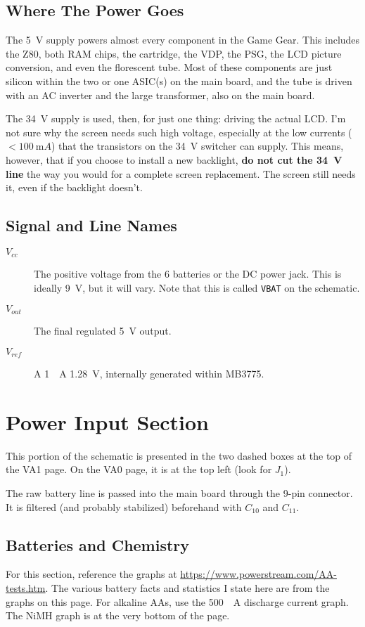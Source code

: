 \documentclass{article}
\newcommand{\Vcc}{$V_{cc}$}
\newcommand{\Vout}{$V_{out}$}
\newcommand{\Vref}{$V_{ref}$}
\newcommand{\model}{\textsf}
\begin{document}
\subsection{Where The Power Goes}
The \qty{5}{\volt} supply powers almost every component in the Game
Gear. This includes the \model{Z80}, both RAM chips, the cartridge,
the VDP, the PSG, the LCD picture conversion, and even the florescent
tube. Most of these components are just silicon within the two or one
ASIC(s) on the main board, and the tube is driven with an AC inverter
and the large transformer, also on the main board.

The \qty{34}{\volt} supply is used, then, for just one thing: driving
the actual LCD. I'm not sure why the screen needs such high voltage,
especially at the low currents ($<\qty{100}{\milli{}A}$) that the
transistors on the \qty{34}{\volt} switcher can supply. This means,
however, that if you choose to install a new backlight, \textbf{do not
  cut the \qty{34}{\volt} line} the way you would for a complete
screen replacement. The screen still needs it, even if the backlight
doesn't.

\subsection{Signal and Line Names}
\begin{description}
\item[\Vcc{}] The positive voltage from the 6 batteries or the DC power
  jack. This is ideally \qty{9}{\volt}, but it will vary. Note that
  this is called \texttt{VBAT} on the schematic.
\item[\Vout{}] The final regulated \qty{5}{\volt} output.
\item[\Vref{}] A \qty{1}{\milli{}A} \qty{1.28}{\volt}, internally
  generated within \model{MB3775}.
\end{description}

\section{Power Input Section}
This portion of the schematic is presented in the two dashed boxes at
the top of the \model{VA1} page. On the \model{VA0} page, it is at the
top left (look for $J_1$).

The raw battery line is passed into the main board through the 9-pin
connector. It is filtered (and probably stabilized) beforehand with
$C_{10}$ and $C_{11}$.

\subsection{Batteries and Chemistry}
\label{sec:batteries_chemistry}
For this section, reference the graphs at
\url{https://www.powerstream.com/AA-tests.htm}. The various battery
facts and statistics I state here are from the graphs on this
page. For alkaline AAs, use the \qty{500}{\milli{}A} discharge current
graph. The NiMH graph is at the very bottom of the page.
\end{document}

